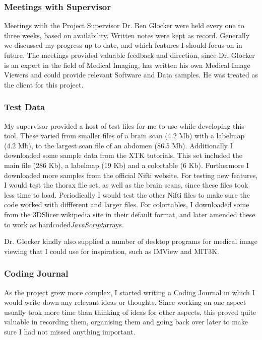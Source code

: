 \documentclass[a4paper,11pt,twoside]{article}
\begin{document}
\subsubsection{Meetings with Supervisor}

Meetings with the Project Supervisor Dr. Ben Glocker were held every one to three weeks, based on availability. Written notes were kept as record. Generally we discussed my progress up to date, and which features I should focus on in future. The meetings provided valuable feedback and direction, since Dr. Glocker is an expert in the field of Medical Imaging, has written his own Medical Image Viewers and could provide relevant Software and Data samples. He was treated as the client for this project.


\subsubsection{Test Data}

My supervisor provided a host of test files for me to use while developing this tool. These varied from smaller files of a brain scan (4.2 Mb) with a labelmap (4.2 Mb), to the largest scan file of an abdomen (86.5 Mb). Additionally I downloaded some sample data from the XTK tutorials. This set included the main file (286 Kb), a labelmap (19 Kb) and a colortable (6 Kb). Furthermore I downloaded more samples from the official Nifti website. For testing new features, I would test the thorax file set, as well as the brain scans, since these files took less time to load. Periodically I would test the other Nifti files to make sure the code worked with diffferent and larger files.
For colortables, I downloaded some from the 3DSlicer wikipedia site in their default format, and later amended these to work as hardcoded\textit{JavaScript}arrays.

Dr. Glocker kindly also supplied a number of desktop programs for medical image viewing that I could use for inspiration, such as IMView and MIT3K.

\subsubsection{Coding Journal}

As the project grew more complex, I started writing a Coding Journal in which I would write down any relevant ideas or thoughts. Since working on one aspect usually took more time than thinking of ideas for other aspects, this proved quite valuable in recording them, organising them and going back over later to make sure I had not missed anything important.
\end{document}
